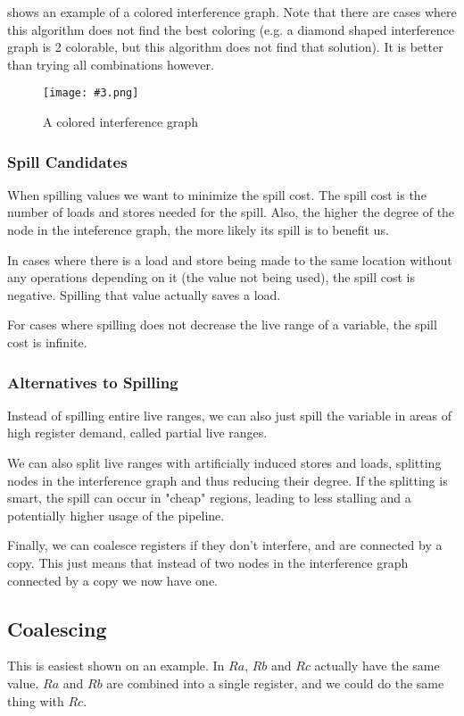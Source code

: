 \documentclass{article}
\newcommand{\fig}[4]{
	\begin{figure}[#1]
		\center
		\texttt{[image: \#3.png]}
		\caption{#4}
		\label{fig:#3}
	\end{figure}
	}
\begin{document}
 shows an example of a colored interference graph.
Note that there are cases where this algorithm does not find the best coloring (e.g. a diamond shaped interference graph is 2 colorable, but this algorithm does not find that solution).
It is better than trying all combinations however.

\fig{h}{0.6}{coloring}{A colored interference graph}

\subsubsection{Spill Candidates}
When spilling values we want to minimize the spill cost.
The spill cost is the number of loads and stores needed for the spill.
Also, the higher the degree of the node in the inteference graph, the more likely its spill is to benefit us.

In cases where there is a load and store being made to the same location without any operations depending on it (the value not being used), the spill cost is negative.
Spilling that value actually saves a load.

For cases where spilling does not decrease the live range of a variable, the spill cost is infinite.

\subsubsection{Alternatives to Spilling}
Instead of spilling entire live ranges, we can also just spill the variable in areas of high register demand, called partial live ranges.

We can also split live ranges with artificially induced stores and loads, splitting nodes in the interference graph and thus reducing their degree.
If the splitting is smart, the spill can occur in "cheap" regions, leading to less stalling and a potentially higher usage of the pipeline.

Finally, we can coalesce registers if they don't interfere, and are connected by a copy.
This just means that instead of two nodes in the interference graph connected by a copy we now have one.

\subsection{Coalescing}
This is easiest shown on an example.
In  $Ra$, $Rb$ and $Rc$ actually have the same value.
$Ra$ and $Rb$ are combined into a single register, and we could do the same thing with $Rc$.
\end{document}
